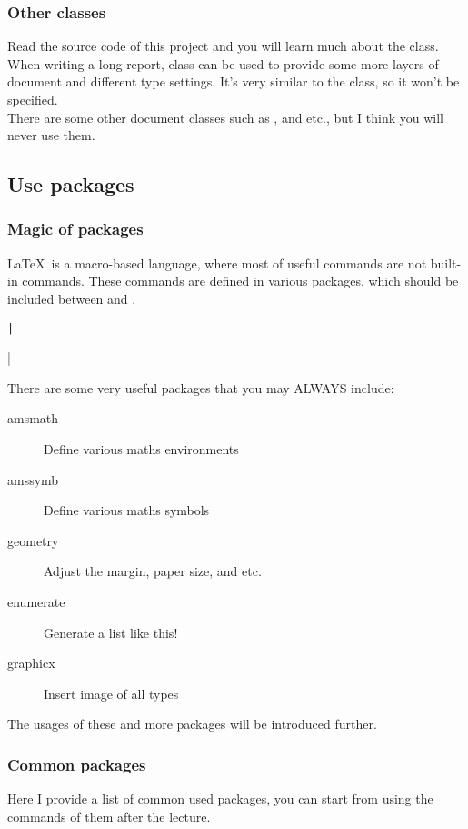 \begin{frame}
	\frametitle{Other classes}

	Read the source code of this project and you will learn much about the  class. \\

	When writing a \alert{long} report,  class can be used to provide some more layers of document and different type settings. It's very similar to the  class, so it won't be specified. \\

	There are some other document classes such as ,  and etc., but I think you will never use them.

\end{frame}

\subsection{Use packages}

\begin{frame}[fragile]
	\frametitle{Magic of packages}
	\LaTeX\ is a macro-based language, where most of useful commands are not built-in commands. These commands are defined in various packages, which should be included between \LC{\documentclass} and \LC{}.
	\begin{command}
		\texttt|\usepackage[options]{package}|
	\end{command}
	There are some very useful packages that you may \alert{ALWAYS} include:
	\begin{description}
		\item[amsmath] Define various maths environments
		\item[amssymb] Define various maths symbols
		\item[geometry] Adjust the margin, paper size, and etc.
		\item[enumerate] Generate a list like this!
		\item[graphicx] Insert image of all types
	\end{description}
	The usages of these and more packages will be introduced further.
\end{frame}

\begin{frame}[fragile]
	\frametitle{Common packages}
	Here I provide a list of common used packages, you can start from using the commands of them after the lecture.

	\inputminted{latex}{examples/packages.tex}
\end{frame}

